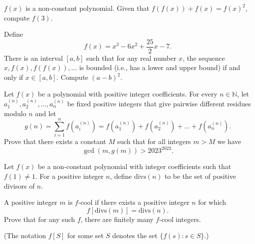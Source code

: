\begin{question}[name={2023 Stanford Math Tournament, \href{https://artofproblemsolving.com/community/c383h3065231p27653943}{Algebra Tiebreaker \#2}}]
	$f(x)$ is a non-constant polynomial. Given that $f(f(x)) + f(x) = f(x)^2$, compute $f(3)$.	
\end{question}



%	



\begin{question}[name={2023 Stanford Math Tournament, \href{https://artofproblemsolving.com/community/c383h3065232p27653957}{Algebra Tiebreaker \#3}}]
	Define $$f(x)=x^3-6x^2+\frac{25}{2}x-7.$$ There is an interval $[a,b]$ such that for any real number $x$, the sequence $x,f(x),f(f(x)),\dots$ is bounded (i.e., has a lower and upper bound) if and only if $x\in[a,b]$. Compute $(a-b)^2$.
\end{question}



%	




\begin{question}[name={2023 Bulgaria National Olympiad, \href{https://artofproblemsolving.com/community/c6h3048321p27461669}{Problem 3}}]
	Let $f(x)$ be a polynomial with positive integer coefficients. For every $n\in\mathbb{N}$, let $a_{1}^{(n)}, a_{2}^{(n)}, \dots , a_{n}^{(n)}$ be fixed positive integers that give pairwise different residues modulo $n$ and let
	\[g(n) = \sum\limits_{i=1}^{n} f(a_{i}^{(n)}) = f(a_{1}^{(n)}) + f(a_{2}^{(n)}) + \dots  + f(a_{n}^{(n)}).\]Prove that there exists a constant $M$ such that for all integers $m>M$ we have $$\gcd(m, g(m))>2023^{2023}.$$
\end{question}

%	


\begin{question}[name={2023 Canada National Olympiad, \href{https://artofproblemsolving.com/community/c6h3029964p27258241}{Problem 4}}]
	Let $f(x)$ be a non-constant polynomial with integer coefficients such that $f(1) \neq 1$. For a positive integer $n$, define $\text{divs}(n)$ to be the set of positive divisors of $n$.
	
	A positive integer $m$ is $f$-cool if there exists a positive integer $n$ for which$$f[\text{divs}(m)]=\text{divs}(n).$$Prove that for any such $f$, there are finitely many $f$-cool integers.
	
	(The notation $f[S]$ for some set $S$ denotes the set $\{f(s):s \in S\}$.)
\end{question}


